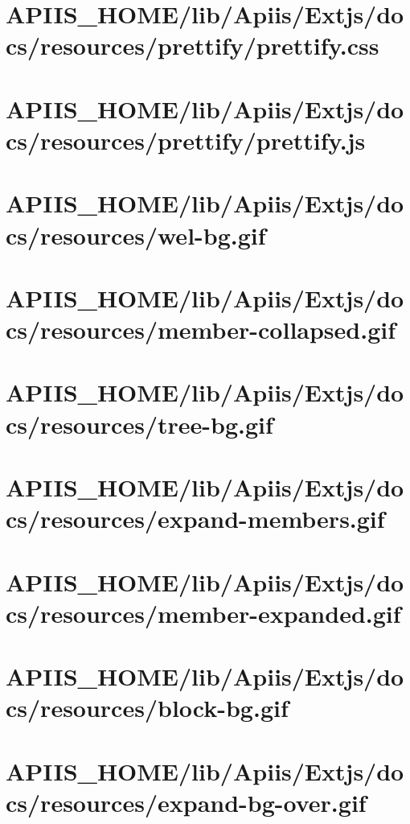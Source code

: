 \section{APIIS\_HOME/lib/Apiis/Extjs/docs/resources/prettify/prettify.css} 
\section{APIIS\_HOME/lib/Apiis/Extjs/docs/resources/prettify/prettify.js} 
\section{APIIS\_HOME/lib/Apiis/Extjs/docs/resources/wel-bg.gif} 
\section{APIIS\_HOME/lib/Apiis/Extjs/docs/resources/member-collapsed.gif} 
\section{APIIS\_HOME/lib/Apiis/Extjs/docs/resources/tree-bg.gif} 
\section{APIIS\_HOME/lib/Apiis/Extjs/docs/resources/expand-members.gif} 
\section{APIIS\_HOME/lib/Apiis/Extjs/docs/resources/member-expanded.gif} 
\section{APIIS\_HOME/lib/Apiis/Extjs/docs/resources/block-bg.gif} 
\section{APIIS\_HOME/lib/Apiis/Extjs/docs/resources/expand-bg-over.gif} 
